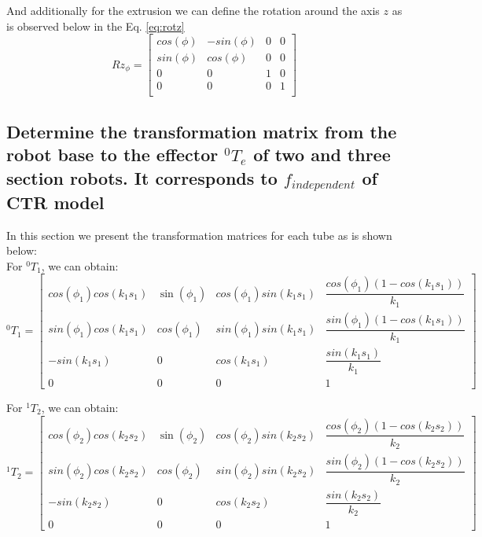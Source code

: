 \documentclass[12pt, twoside]{report}
\begin{document}
And additionally for the extrusion we can define the rotation around the axis $z$ as is observed below in the Eq. \ref{eq:rotz}\\
\begin{equation}
    Rz_{\phi}=\begin{bmatrix}
        cos(\phi) &-sin(\phi) &0 &0 \\
        sin(\phi) & cos(\phi) & 0 & 0 \\
        0 & 0 & 1 & 0 \\
        0 & 0 & 0 &1 \\
    \end{bmatrix}
    \label{eq:rotz}
\end{equation}


\subsection{Determine the transformation matrix from the robot base to the effector $^0 T_e$ of two and three
section robots. It corresponds to $f_{independent}$ of CTR model}
In this section we present the transformation matrices for each tube as is shown below:\\
For $^0 T_1$, we can obtain:\\
\begin{equation}
    ^0 T_1=\begin{bmatrix}
        cos(\phi_1)cos(k_1 s_1 ) & \sin(\phi_1) &cos(\phi_1) sin(k_1 s_1)& \dfrac{cos(\phi_1)(1-cos(k_1 s_1))}{k_1}\\
        
        sin(\phi_1)cos(k_1 s_1) & cos(\phi_1) & sin(\phi_1)sin(k_1 s_1) &  \dfrac{sin(\phi_1)(1-cos(k_1 s_1))}{k_1}\\
        -sin(k_1 s_1) & 0 & cos(k_1 s_1) & \dfrac{sin(k_1 s_1)}{k_1}\\
        0 & 0 & 0 & 1
    \end{bmatrix}
    \label{eq:homogen1}
\end{equation}

For $^1 T_2$, we can obtain:\\
\begin{equation}
    ^1 T_2=\begin{bmatrix}
        cos(\phi_2)cos(k_2 s_2 ) & \sin(\phi_2) &cos(\phi_2) sin(k_2 s_2)& \dfrac{cos(\phi_2)(1-cos(k_2 s_2))}{k_2}\\
        
        sin(\phi_2)cos(k_2 s_2) & cos(\phi_2) & sin(\phi_2)sin(k_2 s_2) &  \dfrac{sin(\phi_2)(1-cos(k_2 s_2))}{k_2}\\
        -sin(k_2 s_2) & 0 & cos(k_2 s_2) & \dfrac{sin(k_2 s_2)}{k_2}\\
        0 & 0 & 0 & 1
    \end{bmatrix}
    \label{eq:homogen1}
\end{equation}
\end{document}
